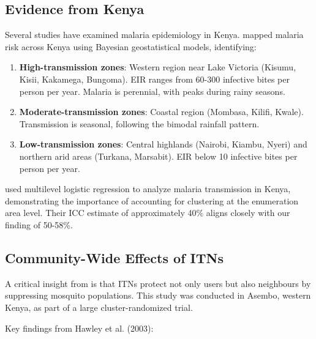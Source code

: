 \subsection{Evidence from Kenya}

Several studies have examined malaria epidemiology in Kenya. \citet{noor2009risks} mapped malaria risk across Kenya using Bayesian geostatistical models, identifying:

\begin{enumerate}
	\item \textbf{High-transmission zones}: Western region near Lake Victoria (Kisumu, Kisii, Kakamega, Bungoma). EIR ranges from 60-300 infective bites per person per year. Malaria is perennial, with peaks during rainy seasons.
	
	\item \textbf{Moderate-transmission zones}: Coastal region (Mombasa, Kilifi, Kwale). Transmission is seasonal, following the bimodal rainfall pattern.
	
	\item \textbf{Low-transmission zones}: Central highlands (Nairobi, Kiambu, Nyeri) and northern arid areas (Turkana, Marsabit). EIR below 10 infective bites per person per year.
\end{enumerate}

\citet{ayele2024assessment} used multilevel logistic regression to analyze malaria transmission in Kenya, demonstrating the importance of accounting for clustering at the enumeration area level. Their ICC estimate of approximately 40\% aligns closely with our finding of 50-58\%.

\subsection{Community-Wide Effects of ITNs}

A critical insight from \citet{hawley2003community} is that ITNs protect not only users but also neighbours by suppressing mosquito populations. This study was conducted in Asembo, western Kenya, as part of a large cluster-randomized trial.

Key findings from Hawley et al. (2003):

